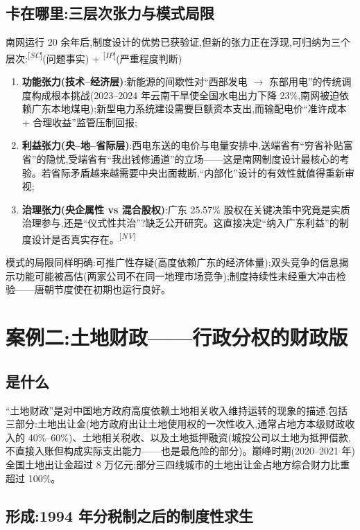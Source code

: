 \documentclass[UTF8,12pt,a4paper]{ctexrep}
\newcommand{\src}[1]{\textsuperscript{[\emph{#1}]}}
\begin{document}
\subsection{卡在哪里:三层次张力与模式局限}

南网运行 20 余年后,制度设计的优势已获验证,但新的张力正在浮现,可归纳为三个层次:\src{SC}(问题事实) + \src{IP}(严重程度判断)

\begin{enumerate}
  \item \textbf{功能张力(技术--经济层)}:新能源的间歇性对``西部发电 $\rightarrow$ 东部用电''的传统调度构成根本挑战(2023--2024 年云南干旱使全国水电出力下降 23\%,南网被迫依赖广东本地煤电);新型电力系统建设需要巨额资本支出,而输配电价``准许成本 + 合理收益''监管压制回报;
  \item \textbf{利益张力(央--地--省际层)}:西电东送的电价与电量安排中,送端省有``穷省补贴富省''的隐忧,受端省有``我出钱修通道''的立场——这是南网制度设计最核心的考验。若省际矛盾越来越需要中央出面裁断,``内部化''设计的有效性就值得重新审视;
  \item \textbf{治理张力(央企属性 vs 混合股权)}:广东 25.57\% 股权在关键决策中究竟是实质治理参与,还是``仪式性共治''?缺乏公开研究。这直接决定``纳入广东利益''的制度设计是否真实存在。\src{NV}
\end{enumerate}

模式的局限同样明确:可推广性存疑(高度依赖广东的经济体量);双头竞争的信息揭示功能可能被高估(两家公司不在同一地理市场竞争);制度持续性未经重大冲击检验——唐朝节度使在初期也运行良好。

\section{案例二:土地财政——行政分权的财政版}\label{sec:land}

\subsection{是什么}

``土地财政''是对中国地方政府高度依赖土地相关收入维持运转的现象的描述,包括三部分:土地出让金(地方政府出让土地使用权的一次性收入,通常占地方本级财政收入的 40\%--60\%)、土地相关税收、以及土地抵押融资(城投公司以土地为抵押借款,不直接入账但构成实际支出能力——也是最危险的部分)。巅峰时期(2020--2021 年)全国土地出让金超过 8 万亿元;部分三四线城市的土地出让金占地方综合财力比重超过 100\%。

\subsection{形成:1994 年分税制之后的制度性求生}
\end{document}

